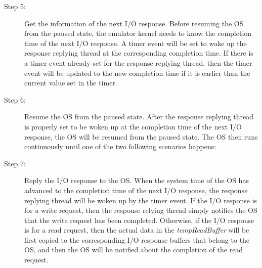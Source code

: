 \begin{description}
	\item[Step 5:] Get the information of the next I/O response. Before resuming the OS from the paused state, the emulator kernel needs to know the completion time of the next I/O response. A timer event will be set to wake up the response replying thread at the corresponding completion time. If there is a timer event already set for the response replying thread, then the timer event will be updated to the new completion time if it is earlier than the current value set in the timer.
	
	\item[Step 6:] Resume the OS from the paused state. After the response replying thread is properly set to be woken up at the completion time of the next I/O response, the OS will be resumed from the paused state. The OS then runs continuously until one of the two following scenarios happens:

	\item[Step 7:] Reply the I/O response to the OS. When the system time of the OS has advanced to the completion time of the next I/O response, the response replying thread will be woken up by the timer event. If the I/O response is for a write request, then the response relying thread simply notifies the OS that the write request has been completed. Otherwise, if the I/O response is for a read request, then the actual data in the \textit{tempReadBuffer} will be first copied to the corresponding I/O response buffers that belong to the OS, and then the OS will be notified about the completion of the read request.
\end{description}


